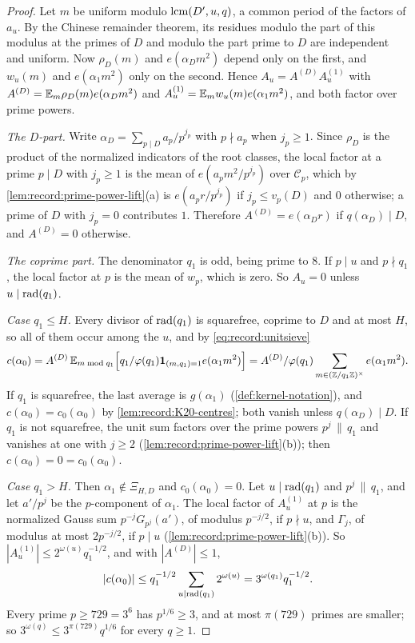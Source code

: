 \begin{proof}
Let $m$ be uniform modulo $\operatorname{lcm}(D',u,q)$, a common period of the factors of
$a_u$. By the Chinese remainder theorem, its residues modulo the part of this
modulus at the primes of $D$ and modulo the part prime to $D$ are independent
and uniform. Now $\rho_D(m)$ and $e(\alpha_Dm^2)$ depend only on the first,
and $w_u(m)$ and $e(\alpha_1m^2)$ only on the second. Hence
$A_u=A^{(D)}A^{(1)}_u$ with $A^{(D)}=\mathbb E_m\rho_D(m)e(\alpha_Dm^2)$ and
$A^{(1)}_u=\mathbb E_mw_u(m)e(\alpha_1m^2)$, and both factor over prime powers.

\emph{The $D$-part.} Write $\alpha_D=\sum_{p\mid D}a_p/p^{j_p}$ with
$p\nmid a_p$ when $j_p\ge1$. Since $\rho_D$ is the product of the normalized
indicators of the root classes, the local factor at a prime $p\mid D$ with
$j_p\ge1$ is the mean of $e(a_pm^2/p^{j_p})$ over $\mathcal C_p$, which by
\cref{lem:record:prime-power-lift}(a) is $e(a_pr/p^{j_p})$ if
$j_p\le v_p(D)$ and $0$ otherwise; a prime of $D$ with $j_p=0$ contributes
$1$. Therefore $A^{(D)}=e(\alpha_Dr)$ if $q(\alpha_D)\mid D$, and $A^{(D)}=0$
otherwise.

\emph{The coprime part.} The denominator $q_1$ is odd, being prime to $8$. If
$p\mid u$ and $p\nmid q_1$, the local factor at $p$ is the mean of $w_p$,
which is zero. So $A_u=0$ unless $u\mid\operatorname{rad}(q_1)$.

\emph{Case $q_1\le H$.} Every divisor of $\operatorname{rad}(q_1)$ is squarefree, coprime
to $D$ and at most $H$, so all of them occur among the $u$, and by
\eqref{eq:record:unitsieve}
\[
 c(\alpha_0)=A^{(D)}\,\mathbb E_{m\bmod q_1}\Big[q_1/\varphi(q_1)
 \mathbf 1_{(m,q_1)=1}e(\alpha_1m^2)\Big]
 =A^{(D)}/\varphi(q_1)\sum_{m\in(\mathbb Z/q_1\mathbb Z)^\times}e(\alpha_1m^2).
\]
If $q_1$ is squarefree, the last average is $g(\alpha_1)$
(\cref{def:kernel-notation}), and $c(\alpha_0)=c_0(\alpha_0)$ by
\cref{lem:record:K20-centres}; both vanish unless $q(\alpha_D)\mid D$. If $q_1$
is not squarefree, the unit sum factors over the prime powers $p^j\,\|\,q_1$
and vanishes at one with $j\ge2$ (\cref{lem:record:prime-power-lift}(b)); then
$c(\alpha_0)=0=c_0(\alpha_0)$.

\emph{Case $q_1>H$.} Then $\alpha_1\notin\Xi_{H,D}$ and $c_0(\alpha_0)=0$. Let
$u\mid\operatorname{rad}(q_1)$ and $p^j\,\|\,q_1$, and let $a'/p^j$ be the $p$-component of
$\alpha_1$. The local factor of $A^{(1)}_u$ at $p$ is the normalized Gauss sum
$p^{-j}G_{p^j}(a')$, of modulus $p^{-j/2}$, if $p\nmid u$, and $\Gamma_j$, of
modulus at most $2p^{-j/2}$, if $p\mid u$ (\cref{lem:record:prime-power-lift}(b)).
So $|A^{(1)}_u|\le2^{\omega(u)}q_1^{-1/2}$, and with $|A^{(D)}|\le1$,
\[
 |c(\alpha_0)|\le q_1^{-1/2}\sum_{u\mid\operatorname{rad}(q_1)}2^{\omega(u)}=3^{\omega(q_1)}q_1^{-1/2}.
\]
Every prime $p\ge729=3^6$ has $p^{1/6}\ge3$, and at most $\pi(729)$ primes are
smaller; so $3^{\omega(q)}\le3^{\pi(729)}q^{1/6}$ for every $q\ge1$.
\end{proof}

